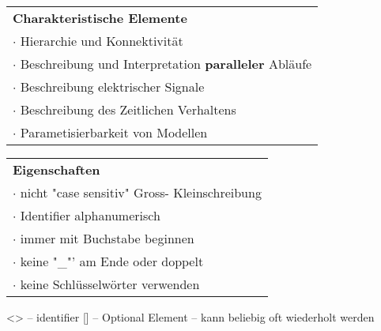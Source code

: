 \begin{minipage}{0.45\textwidth}
	\begin{tabular}{l}
		\textbf{Charakteristische Elemente}\\
		$\cdot$ Hierarchie und Konnektivität \\
		$\cdot$ Beschreibung und Interpretation \textbf{paralleler} Abläufe \\
		$\cdot$ Beschreibung elektrischer Signale \\
		$\cdot$ Beschreibung des Zeitlichen Verhaltens  \\
		$\cdot$ Parametisierbarkeit von Modellen \\
	\end{tabular}
\end{minipage}
\begin{minipage}{0.32\textwidth}
	\begin{tabular}{l}
		\textbf{Eigenschaften}\\
		$\cdot$ nicht "case sensitiv"  {\tiny Gross- Kleinschreibung}\\
		$\cdot$ Identifier alphanumerisch  \\
		\quad$\cdot$ immer mit Buchstabe beginnen \\
		\quad$\cdot$ keine "\_"' am Ende oder doppelt  \\
		\quad$\cdot$ keine Schlüsselwörter verwenden \\
	\end{tabular}
\end{minipage}
\begin{minipage}{0.2\textwidth}
	\begin{VHDL}
<>  -- identifier
[]  -- Optional Element
{}  -- kann beliebig oft wiederholt werden
	\end{VHDL}
\end{minipage}